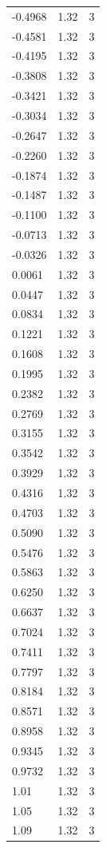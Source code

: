 \begin{longtable}{lrr}
  -0.4968 & 1.32 & 3 \\
  -0.4581 & 1.32 & 3 \\
  -0.4195 & 1.32 & 3 \\
  -0.3808 & 1.32 & 3 \\
  -0.3421 & 1.32 & 3 \\
  -0.3034 & 1.32 & 3 \\
  -0.2647 & 1.32 & 3 \\
  -0.2260 & 1.32 & 3 \\
  -0.1874 & 1.32 & 3 \\
  -0.1487 & 1.32 & 3 \\
  -0.1100 & 1.32 & 3 \\
  -0.0713 & 1.32 & 3 \\
  -0.0326 & 1.32 & 3 \\
  0.0061 & 1.32 & 3 \\
  0.0447 & 1.32 & 3 \\
  0.0834 & 1.32 & 3 \\
  0.1221 & 1.32 & 3 \\
  0.1608 & 1.32 & 3 \\
  0.1995 & 1.32 & 3 \\
  0.2382 & 1.32 & 3 \\
  0.2769 & 1.32 & 3 \\
  0.3155 & 1.32 & 3 \\
  0.3542 & 1.32 & 3 \\
  0.3929 & 1.32 & 3 \\
  0.4316 & 1.32 & 3 \\
  0.4703 & 1.32 & 3 \\
  0.5090 & 1.32 & 3 \\
  0.5476 & 1.32 & 3 \\
  0.5863 & 1.32 & 3 \\
  0.6250 & 1.32 & 3 \\
  0.6637 & 1.32 & 3 \\
  0.7024 & 1.32 & 3 \\
  0.7411 & 1.32 & 3 \\
  0.7797 & 1.32 & 3 \\
  0.8184 & 1.32 & 3 \\
  0.8571 & 1.32 & 3 \\
  0.8958 & 1.32 & 3 \\
  0.9345 & 1.32 & 3 \\
  0.9732 & 1.32 & 3 \\
  1.01 & 1.32 & 3 \\
  1.05 & 1.32 & 3 \\
  1.09 & 1.32 & 3 \\

\end{longtable}
